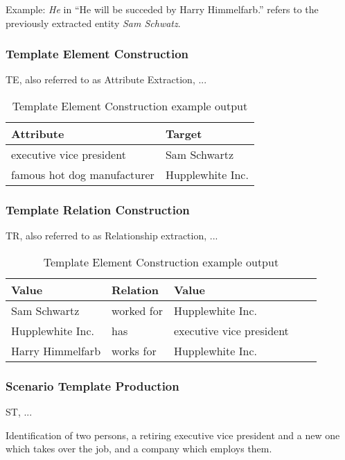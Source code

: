 Example: \textit{He} in \enquote{He will be succeded by Harry Himmelfarb.} refers to the previously extracted entity \textit{Sam Schwatz}.

\subsubsection{Template Element Construction}
\gls{TE}, also referred to as Attribute Extraction, ...

\begin{table}[H]
\centering
\begin{tabular*}{\textwidth}{ l  l }
	\toprule
	\textbf{Attribute} & \textbf{Target} \\
	\midrule
	executive vice president & Sam Schwartz \\
	famous hot dog manufacturer & Hupplewhite Inc. \\
	\bottomrule
\end{tabular*}
\caption{Template Element Construction example output}
\end{table}

\subsubsection{Template Relation Construction}
\gls{TR}, also referred to as Relationship extraction, ...

\begin{table}[H]
\centering
\begin{tabular*}{\textwidth}{ l l l l l }
	\toprule
	\textbf{Value} & \textbf{Relation}  & \textbf{Value} \\
	\midrule
	Sam Schwartz & worked for & Hupplewhite Inc. \\
	Hupplewhite Inc. & has & executive vice president \\
	Harry Himmelfarb & works for & Hupplewhite Inc. \\
	\bottomrule
\end{tabular*}
\caption{Template Element Construction example output}
\end{table}

\subsubsection{Scenario Template Production}
\gls{ST}, ...

Identification of two persons, a retiring executive vice president and a new one which takes over the job, and a company which employs them.

